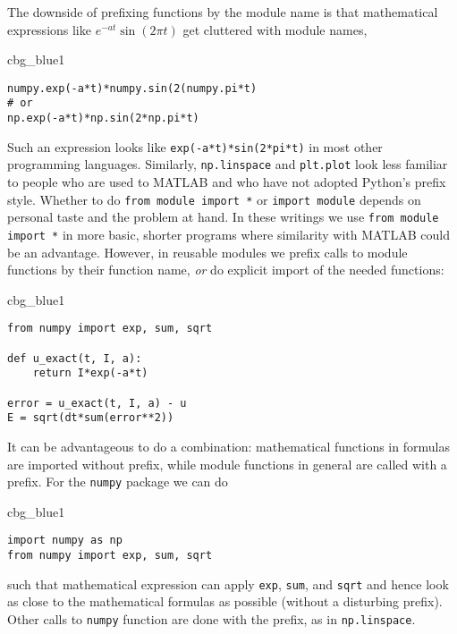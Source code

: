 \documentclass[graybox,sectrefs,envcountresetchap,open=right,final]{svmonodo}
\newenvironment{_cod_tight}[1]{
   \def\FrameCommand{\colorbox{#1}}
   \FrameRule0.6pt\MakeFramed {\FrameRestore}\vskip3mm}
   {\vskip0mm\endMakeFramed}
\newenvironment{cod}[1]{
\bgroup\rmfamily
\fboxsep=0mm\relax
\begin{_cod_tight}{#1}
\list{}{\parsep=-2mm\parskip=0mm\topsep=0pt\leftmargin=2mm
\rightmargin=2\leftmargin\leftmargin=4pt\relax}
\item\relax}
{\endlist\end{_cod_tight}\egroup}
\newenvironment{notice_mdfboxadmon}[1][]{
\begin{notice_mdfboxmdframed}[frametitle=#1]
}
{
\end{notice_mdfboxmdframed}
}
\begin{document}
The downside of prefixing functions by the module name is that
mathematical expressions like $e^{-at}\sin(2\pi t)$ get
cluttered with module names,
\begin{cod}{cbg_blue1}\begin{Verbatim}[numbers=none,fontsize=\fontsize{9pt}{9pt},baselinestretch=0.95,xleftmargin=2mm]
numpy.exp(-a*t)*numpy.sin(2(numpy.pi*t)
# or
np.exp(-a*t)*np.sin(2*np.pi*t)
\end{Verbatim}
\end{cod}
\noindent
Such an expression looks like \texttt{exp(-a*t)*sin(2*pi*t)} in most other
programming languages. Similarly, \texttt{np.linspace} and \texttt{plt.plot} look
less familiar to people who are used to MATLAB and who have not
adopted Python's prefix style.  Whether to do \texttt{from module import *}
or \texttt{import module} depends on personal taste and the problem at
hand. In these writings we use \texttt{from module import *} in more basic,
shorter programs where similarity with MATLAB could be an
advantage. However, in reusable modules we prefix calls to module
functions by their function name, \emph{or} do explicit import of the
needed functions:

\begin{cod}{cbg_blue1}\begin{Verbatim}[numbers=none,fontsize=\fontsize{9pt}{9pt},baselinestretch=0.95,xleftmargin=2mm]
from numpy import exp, sum, sqrt

def u_exact(t, I, a):
    return I*exp(-a*t)

error = u_exact(t, I, a) - u
E = sqrt(dt*sum(error**2))
\end{Verbatim}
\end{cod}
\noindent


\begin{notice_mdfboxadmon}
It can be advantageous to do a combination: mathematical functions
in formulas are imported without prefix, while module functions
in general are called with a prefix. For the \texttt{numpy} package we
can do

\begin{cod}{cbg_blue1}\begin{Verbatim}[numbers=none,fontsize=\fontsize{9pt}{9pt},baselinestretch=0.95,xleftmargin=2mm]
import numpy as np
from numpy import exp, sum, sqrt
\end{Verbatim}
\end{cod}
\noindent
such that mathematical expression can apply \texttt{exp}, \texttt{sum}, and \texttt{sqrt}
and hence look as close to the mathematical formulas as possible
(without a disturbing prefix).
Other calls to \texttt{numpy} function are done with the prefix, as in
\texttt{np.linspace}.
\end{notice_mdfboxadmon}
\end{document}
